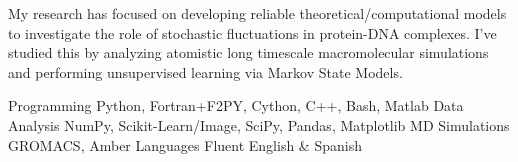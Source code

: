 
\begin{cvparagraph}
    My research has focused on developing reliable theoretical/computational models to investigate the role of stochastic fluctuations in protein-DNA complexes. I've studied this by analyzing atomistic long timescale macromolecular simulations and performing unsupervised learning via Markov State Models. 
\end{cvparagraph}

\begin{cvskills}
    \cvskill
        {Programming}
        {Python, Fortran+F2PY, Cython, C++, Bash, Matlab}
    \cvskill
        {Data Analysis}
        {NumPy, Scikit-Learn/Image, SciPy, Pandas, Matplotlib}
    \cvskill
        {MD Simulations}
        {GROMACS, Amber}
    \cvskill
        {Languages}
        {Fluent English \& Spanish}
\end{cvskills}
